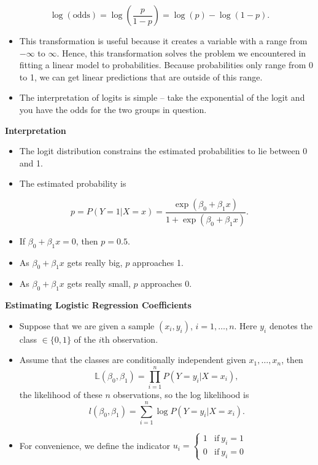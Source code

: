 \documentclass[]{book}
\providecommand{\tightlist}{%
  \setlength{\itemsep}{0pt}\setlength{\parskip}{0pt}}
\begin{document}
\[
\log (\mathrm{odds})=\log\left(\frac{p}{1-p}\right)=\log{(p)}-\log{(1-p)}.
\]

\begin{itemize}
\item
  This transformation is useful because it creates a variable with a
  range from \(-\infty\) to \(\infty\). Hence, this transformation
  solves the problem we encountered in fitting a linear model to
  probabilities. Because probabilities only range from 0 to 1, we can
  get linear predictions that are outside of this range.
\item
  The interpretation of logits is simple -- take the exponential of the
  logit and you have the odds for the two groups in question.
\end{itemize}

\textbf{Interpretation}

\begin{itemize}
\item
  The logit distribution constrains the estimated probabilities to lie
  between 0 and 1.
\item
  The estimated probability is
\end{itemize}

\[
p=P(Y=1|X=x)=\frac{\exp(\beta_0+\beta_1x)}{1+\exp(\beta_0+\beta_1x)}.
\]

\begin{itemize}
\tightlist
\item
  If \(\beta_0+\beta_1x=0\), then \(p=0.5\).
\item
  As \(\beta_0+\beta_1x\) gets really big, \(p\) approaches 1.
\item
  As \(\beta_0+\beta_1x\) gets really small, \(p\) approaches 0.
\end{itemize}

\textbf{Estimating Logistic Regression Coefficients}

\begin{itemize}
\item
  Suppose that we are given a sample \((x_{i},y_{i})\),
  \(i=1,\ldots,n\). Here \(y_{i}\) denotes the class \(\in\{0,1\}\) of
  the \(i\)th observation.
\item
  Assume that the classes are conditionally independent given
  \(x_{1},\ldots,x_{n}\), then \[
  \mathbb{L}(\beta_0,\beta_1)=\prod_{i=1}^{n}P(Y=y_{i}|X=x_{i}),
  \] the likelihood of these \(n\) observations, so the log likelihood
  is \[
  l(\beta_0,\beta_1)=\sum_{i=1}^{n}\log{P(Y=y_{i}|X=x_{i})}.
  \]
\item
  For convenience, we define the indicator
  \(u_{i}=\left\{\begin{array}{cc}  1 &\mathrm{if}~y_{i}=1\\  0 &\mathrm{if}~y_{i}=0  \end{array}\right.\)
\end{itemize}
\end{document}
